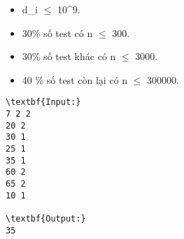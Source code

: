 \begin{itemize}
	\item d\_i  $\le$  10^9.
	\item 30\% số test có n  $\le$  300.
	\item 30\% số test khác có n  $\le$  3000.
	\item 40 \% số test còn lại có n  $\le$  300000.
\end{itemize}
\begin{verbatim}
\textbf{Input:}
7 2 2
20 2
30 1
25 1
35 1
60 2
65 2
10 1

\textbf{Output:}
35\end{verbatim}
